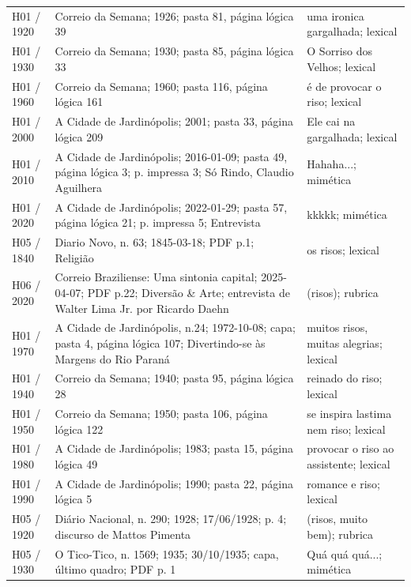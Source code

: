 \begin{longtable}{>{\raggedright\arraybackslash}p{}>{\raggedright\arraybackslash}p{}>{\raggedright\arraybackslash}p{}}
H01 / 1920 & Correio da Semana; 1926; pasta 81, página lógica 39 & uma ironica gargalhada; lexical \cite{r3doc14} \\
H01 / 1930 & Correio da Semana; 1930; pasta 85, página lógica 33 & O Sorriso dos Velhos; lexical \cite{r3doc15} \\
H01 / 1960 & Correio da Semana; 1960; pasta 116, página lógica 161 & é de provocar o riso; lexical \cite{r3doc16} \\
H01 / 2000 & A Cidade de Jardinópolis; 2001; pasta 33, página lógica 209 & Ele cai na gargalhada; lexical \cite{r3doc17} \\
H01 / 2010 & A Cidade de Jardinópolis; 2016-01-09; pasta 49, página lógica 3; p. impressa 3; Só Rindo, Claudio Aguilhera & Hahaha...; mimética \cite{r3doc18} \\
H01 / 2020 & A Cidade de Jardinópolis; 2022-01-29; pasta 57, página lógica 21; p. impressa 5; Entrevista & kkkkk; mimética \cite{r3doc19} \\
H05 / 1840 & Diario Novo, n. 63; 1845-03-18; PDF p.1; Religião & os risos; lexical \cite{r3doc20} \\
H06 / 2020 & Correio Braziliense: Uma sintonia capital; 2025-04-07; PDF p.22; Diversão \& Arte; entrevista de Walter Lima Jr. por Ricardo Daehn & (risos); rubrica \cite{r3doc21} \\
H01 / 1970 & A Cidade de Jardinópolis, n.24; 1972-10-08; capa; pasta 4, página lógica 107; Divertindo-se às Margens do Rio Paraná & muitos risos, muitas alegrias; lexical \cite{r3doc22} \\
H01 / 1940 & Correio da Semana; 1940; pasta 95, página lógica 28 & reinado do riso; lexical \cite{r3doc23} \\
H01 / 1950 & Correio da Semana; 1950; pasta 106, página lógica 122 & se inspira lastima nem riso; lexical \cite{r3doc24} \\
H01 / 1980 & A Cidade de Jardinópolis; 1983; pasta 15, página lógica 49 & provocar o riso ao assistente; lexical \cite{r3doc25} \\
H01 / 1990 & A Cidade de Jardinópolis; 1990; pasta 22, página lógica 5 & romance e riso; lexical \cite{r3doc26} \\
H05 / 1920 & Diário Nacional, n. 290; 1928; 17/06/1928; p. 4; discurso de Mattos Pimenta & (risos, muito bem); rubrica \cite{diarionacional1928} \\
H05 / 1930 & O Tico-Tico, n. 1569; 1935; 30/10/1935; capa, último quadro; PDF p. 1 & Quá quá quá...; mimética \cite{ticotico1935} \\

\end{longtable}
